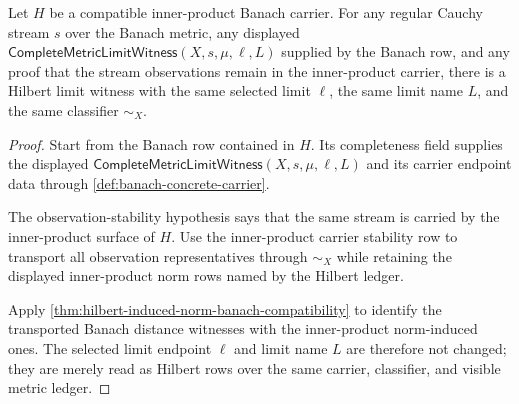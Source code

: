 \begin{theorem}
\label{thm:hilbert-complete-inner-product-limit-stability}
Let $H$ be a compatible inner-product Banach carrier. For any regular Cauchy
stream $s$ over the Banach metric, any displayed
$\mathsf{CompleteMetricLimitWitness}(X,s,\mu,\ell,L)$ supplied by the Banach
row, and any proof that the stream observations remain in the inner-product
carrier, there is a Hilbert limit witness with the same selected limit
$\ell$, the same limit name $L$, and the same classifier $\sim_X$.
\end{theorem}
\begin{proof}
Start from the Banach row contained in $H$. Its completeness field supplies
the displayed $\mathsf{CompleteMetricLimitWitness}(X,s,\mu,\ell,L)$ and its
carrier endpoint data through \autoref{def:banach-concrete-carrier}.

The observation-stability hypothesis says that the same stream is carried by
the inner-product surface of $H$. Use the inner-product carrier stability row
to transport all observation representatives through $\sim_X$ while retaining
the displayed inner-product norm rows named by the Hilbert ledger.

Apply \autoref{thm:hilbert-induced-norm-banach-compatibility} to identify the
transported Banach distance witnesses with the inner-product norm-induced
ones. The selected limit endpoint $\ell$ and limit name $L$ are therefore not
changed; they are merely read as Hilbert rows over the same carrier,
classifier, and visible metric ledger.
\end{proof}

